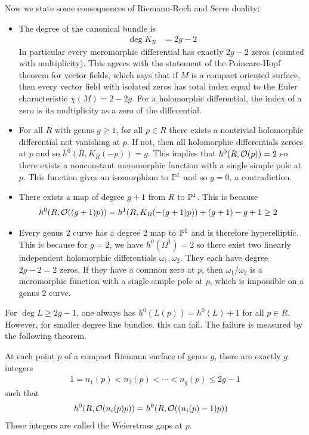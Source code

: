 \documentclass[12pt]{article}
\begin{document}
Now we state some consequences of Riemann-Roch and Serre duality:
\begin{itemize}
    \item The degree of the canonical bundle is \begin{align*}
        \deg K_R & = 2g - 2
    \end{align*} In particular every meromorphic differential has exactly $2g-2$ zeros (counted with multiplicity). This agrees with the statement of the Poincare-Hopf theorem for vector fields, which says that if $M$ is a compact oriented surface, then every vector field with isolated zeros has total index equal to the Euler characteristic $\chi(M) = 2-2g$. For a holomorphic differential, the index of a zero is its multiplicity as a zero of the differential.
    \item For all $R$ with genus $g \geq 1$, for all $p\in R$ there exists a nontrivial holomorphic differential not vanishing at $p$. If not, then all holomorphic differentials zeroes at $p$ and so $h^0(R, K_R(-p)) = g$. This implies that $h^0(R,\cO(p)) = 2$ so there exists a nonconstant meromorphic function with a single simple pole at $p$. This function gives an isomorphism to $\P^1$ and so $g=0$, a contradiction.
    \item There exists a map of degree $g+1$ from $R$ to $\P^1$. This is because \begin{align*}
        h^0(R, \cO((g+1)p)) &= h^1(R, K_R(- (g+1)p)) + (g+1) - g + 1 \geq 2 
    \end{align*}
    \item Every genus $2$ curve has a degree 2 map to $\P^1$ and is therefore hyperelliptic. This is because for $g=2$, we have $h^0(\Omega^1) = 2$ so there exist two linearly independent holomorphic differentials $\omega_1, \omega_2$. They each have degree $2g-2 = 2$ zeros. If they have a common zero at $p$, then $\omega_1/\omega_2$ is a meromorphic function with a single simple pole at $p$, which is impossible on a genus $2$ curve. 
\end{itemize}
For $\deg L \geq 2g - 1$, one always has $h^0(L(p)) = h^0(L) + 1$ for all $p \in R$. However, for smaller degree line bundles, this can fail. The failure is measured by the following theorem.
\begin{theorem}
     At each point $p$ of a compact Riemann surface of genus $g$, there are exactly $g$ integers \begin{align*}
        1 = n_1(p) < n_2(p) < \cdots < n_g(p) \leq 2g - 1
    \end{align*} such that \begin{align*}
        h^0(R, \cO(n_i(p) p)) & = h^0(R, \cO((n_i(p) - 1)p))
    \end{align*} These integers are called the Weierstrass gaps at $p$.
\end{theorem}
\end{document}
